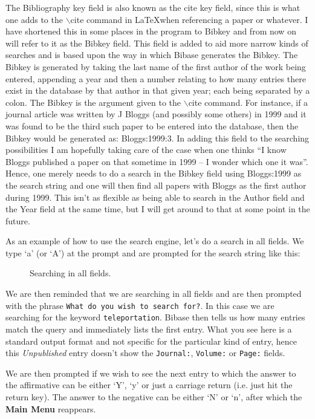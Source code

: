 \documentclass[12pt,a4paper]{book}
\begin{document}
The Bibliography key field is also known as the cite key field, since 
this is what one adds to the $\backslash$cite command in \LaTeX when 
referencing a paper or whatever.  I have shortened this in some 
places in the program to Bibkey and from now on will refer to it as 
the Bibkey field.  This field is added to aid more narrow kinds of 
searches and is based upon the way in which Bibase generates the 
Bibkey.  The Bibkey is generated by taking the last name of the first 
author of the work being entered, appending a year and then a number 
relating to how many entries there exist in the database by that 
author in that given year; each being separated by a colon.  The Bibkey 
is the argument given to the $\backslash$cite command.  For instance, if a 
journal article was written by J Bloggs (and possibly some others) in 1999 
and it was found to be the third such paper to be entered into the database, 
then the Bibkey would be generated as:  Bloggs:1999:3.  In adding 
this field to the searching possibilities I am hopefully taking care 
of the case when one thinks ``I know Bloggs published a paper on that 
sometime in 1999 -- I wonder which one it was''.  Hence, one merely 
needs to do a search in the Bibkey field using Bloggs:1999 as the 
search string and one will then find all papers with Bloggs as the 
first author during 1999.  This isn't as flexible as being able to 
search in the Author field and the Year field at the same time, but I 
will get around to that at some point in the future.

As an example of how to use the search engine, let's do a search in 
all fields.  We type `a' (or `A') at the prompt and are prompted for 
the search string like this:
\begin{figure}[!ht]
\centerline{}
\caption{Searching in all fields.}
\label{fig:searchExample}
\end{figure}
We are then reminded that we are searching in all fields and are then 
prompted with the phrase {\tt What do you wish to search for?}.  In 
this case we are searching for the keyword {\tt teleportation}.  
Bibase then tells us how many entries match the query and immediately 
lists the first entry.  What you see here is a standard output format and 
not specific for the particular kind of entry, hence this 
\emph{Unpublished} entry doesn't show the {\tt Journal:}, {\tt Volume:} 
or {\tt Page:} fields.

We are then prompted if we wish to see the next entry to which the 
answer to the affirmative can be either `Y', `y' or just a carriage 
return (i.e. just hit the return key).  The answer to the negative 
can be either `N' or `n', after which the {\bf Main Menu} reappears.
\end{document}

